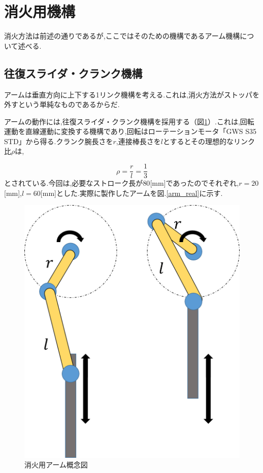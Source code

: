 
\section{消火用機構}
消火方法は前述の通りであるが,ここではそのための機構であるアーム機構について述べる.

\subsection{往復スライダ・クランク機構}
アームは垂直方向に上下する1リンク機構を考える.これは,消火方法がストッパを外すという単純なものであるからだ.

アームの動作には,往復スライダ・クランク機構を採用する（図\ref{arm_con}）.これは,回転運動を直線運動に変換する機構であり,回転はローテーションモータ「GWS S35 STD」から得る.クランク腕長さを$r$,連接棒長さを$l$とするとその理想的なリンク比$\rho$は,

\begin{equation}
	\rho = \frac{r}{l}=\frac{1}{3}
\end{equation}
とされている.今回は,必要なストローク長が$80$[mm]であったのでそれぞれ,$r=20$[mm],$l=60$[mm]とした.実際に製作したアームを図.\ref{arm_real}に示す.

\begin{figure}[h]
 \centering
   \includegraphics[clip,scale=0.3]{../kakeru_last/picture/slide_clank.png}
   \caption{消火用アーム概念図}
 \label{arm_con}
\end{figure}

